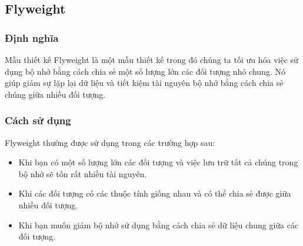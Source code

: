 \subsection{Flyweight}
\subsubsection{Định nghĩa}
Mẫu thiết kế Flyweight là một mẫu thiết kế trong đó chúng ta tối ưu hóa việc sử dụng bộ nhớ bằng cách chia sẻ một số lượng lớn các đối tượng nhỏ chung. Nó giúp giảm sự lặp lại dữ liệu và tiết kiệm tài nguyên bộ nhớ bằng cách chia sẻ chúng giữa nhiều đối tượng.
\subsubsection{Cách sử dụng}
Flyweight thường được sử dụng trong các trường hợp sau:
\begin{itemize}
    \item Khi bạn có một số lượng lớn các đối tượng và việc lưu trữ tất cả chúng trong bộ nhớ sẽ tốn rất nhiều tài nguyên.
    \item Khi các đối tượng có các thuộc tính giống nhau và có thể chia sẻ được giữa nhiều đối tượng.
    \item Khi bạn muốn giảm bộ nhớ sử dụng bằng cách chia sẻ dữ liệu chung giữa các đối tượng.
\end{itemize}
